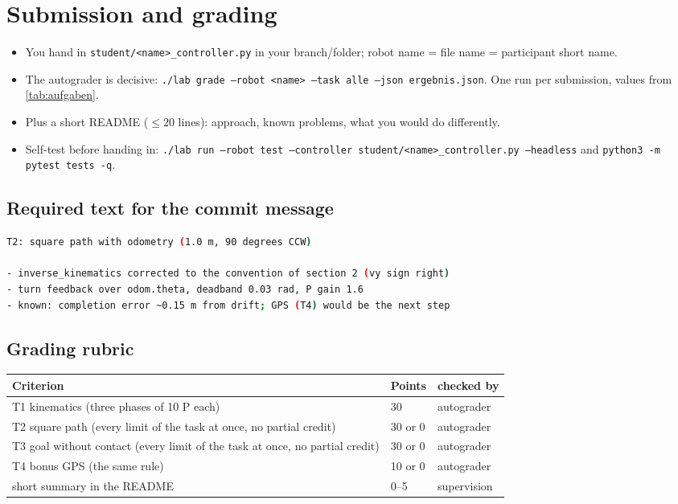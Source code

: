 \documentclass[12pt,a4paper]{scrartcl}
\newcommand{\ordner}[1]{\texttt{#1}}
\newcommand{\kommando}[1]{\texttt{#1}}
\begin{document}
\section{Submission and grading}
\begin{itemize}
  \item You hand in \ordner{student/<name>\_controller.py} in your branch/folder;
        robot name = file name = participant short name.
  \item The autograder is decisive:
        \kommando{./lab grade --robot <name> --task alle --json ergebnis.json}.
        One run per submission, values from \cref{tab:aufgaben}.
  \item Plus a short README (\(\le 20\) lines): approach, known problems,
        what you would do differently.
  \item Self-test before handing in: \kommando{./lab run --robot test --controller
        student/<name>\_controller.py --headless} and
        \kommando{python3 -m pytest tests -q}.
\end{itemize}
\subsection*{Required text for the commit message}
\begin{lstlisting}[language=bash, frame=none, xleftmargin=0pt]
T2: square path with odometry (1.0 m, 90 degrees CCW)

- inverse_kinematics corrected to the convention of section 2 (vy sign right)
- turn feedback over odom.theta, deadband 0.03 rad, P gain 1.6
- known: completion error ~0.15 m from drift; GPS (T4) would be the next step
\end{lstlisting}
\subsection*{Grading rubric}
\begin{table}[ht]\centering\small
\begin{tabular}{@{}p{7.6cm}p{2.6cm}p{4.2cm}@{}}
\toprule
Criterion & Points & checked by \\
\midrule
T1 kinematics (three phases of 10 P each) & 30 & autograder \\
T2 square path (every limit of the task at once, no partial credit) & 30 or 0 & autograder \\
T3 goal without contact (every limit of the task at once, no partial credit) & 30 or 0 & autograder \\
T4 bonus GPS (the same rule) & 10 or 0 & autograder \\
 short summary in the README & 0–5 & supervision \\
\bottomrule
\end{tabular}
\end{table}
\end{document}
